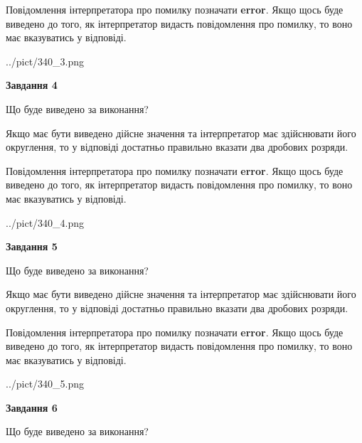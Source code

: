 \documentclass[12pt, ukrainian]{article}
\begin{document}
{\begin {Large}
Повідомлення інтерпретатора про помилку позначати \textbf{error}.
Якщо щось буде виведено до того, як інтерпретатор видасть повідомлення про помилку, 
то воно має вказуватись у відповіді. \par

\begin{center}
	{../pict/340_3.png}
\end{center}
\newpage

{\begin {center}\textbf{Завдання 4}\end {center}}\par
Що буде виведено за виконання? \par

Якщо має бути виведено дійсне значення та інтерпретатор має здійснювати його округлення, 
то у відповіді достатньо правильно вказати два дробових розряди.

Повідомлення інтерпретатора про помилку позначати \textbf{error}.
Якщо щось буде виведено до того, як інтерпретатор видасть повідомлення про помилку, 
то воно має вказуватись у відповіді. \par

\begin{center}
	{../pict/340_4.png}
\end{center}
\newpage

{\begin {center}\textbf{Завдання 5}\end {center}}\par
Що буде виведено за виконання? \par

Якщо має бути виведено дійсне значення та інтерпретатор має здійснювати його округлення, 
то у відповіді достатньо правильно вказати два дробових розряди.

Повідомлення інтерпретатора про помилку позначати \textbf{error}.
Якщо щось буде виведено до того, як інтерпретатор видасть повідомлення про помилку, 
то воно має вказуватись у відповіді. \par

\begin{center}
	{../pict/340_5.png}
\end{center}
\newpage

{\begin {center}\textbf{Завдання 6}\end {center}}\par
Що буде виведено за виконання? \par


\end{Large}}
\end{document}
